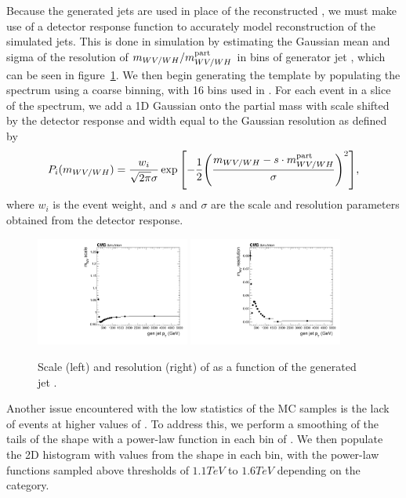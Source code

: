 Because the generated jets are used in place of the reconstructed \Vhad, we must make use of a detector response function to accurately model reconstruction of the simulated jets.
This is done in simulation by estimating the Gaussian mean and sigma of the resolution of $m_{WV/WH}/m_{WV/WH}^\mathrm{part}$ in bins of generator jet \pt, which can be seen in figure~\ref{fig:nonResScaleResMVV}.
We then begin generating the template by populating the \MJ spectrum using a coarse binning, with 16 bins used in \MJ.
For each event in a slice of the \MJ spectrum, we add a 1D Gaussian onto the partial mass with scale shifted by the detector response and width equal to the Gaussian resolution as defined by
\begin{equation}\label{eq:Pplus}
  P_i(\MVV)=\frac{w_i}{\sqrt{2\pi}\sigma}\exp\bqty{-\frac{1}{2}\pqty{\frac{\MVV-s\cdot\MVVpart}{\sigma}}^2},
\end{equation}
where $w_i$ is the event weight, and $s$ and $\sigma$ are the scale and resolution parameters obtained from the detector response.

\begin{figure}[htbp]
  \centering
  \includegraphics[width=0.45\textwidth]{fig/2Dfit/detectorParam_nonRes_scale_MVV.pdf}
  \includegraphics[width=0.45\textwidth]{fig/2Dfit/detectorParam_nonRes_resolution_MVV.pdf}
  \caption{
    Scale (left) and resolution (right) of \MVV as a function of the generated jet \pt.
  }
  \label{fig:nonResScaleResMVV}
\end{figure}

Another issue encountered with the low statistics of the MC samples is the lack of events at higher values of \MVV.
To address this, we perform a smoothing of the tails of the \MVV shape with a power-law function in each bin of \MJ.
We then populate the 2D histogram with values from the \MVV shape in each \MJ bin, with the power-law functions sampled above thresholds of $1.1\unit{TeV}$ to $1.6\unit{TeV}$ depending on the category.

